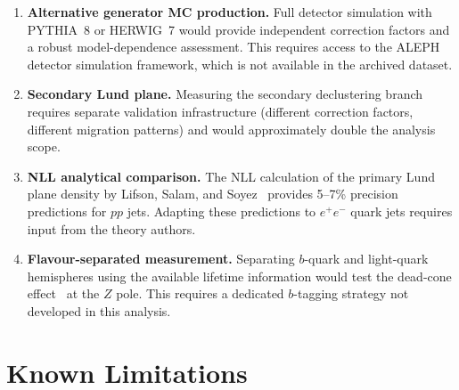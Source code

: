 \documentclass[11pt,a4paper]{article}
\begin{document}
\begin{enumerate}
\item \textbf{Alternative generator MC production.}  Full detector
  simulation with PYTHIA~8 or HERWIG~7 would provide independent
  correction factors and a robust model-dependence assessment.  This
  requires access to the ALEPH detector simulation framework, which
  is not available in the archived dataset.
\item \textbf{Secondary Lund plane.}  Measuring the secondary
  declustering branch requires separate validation infrastructure
  (different correction factors, different migration patterns) and
  would approximately double the analysis scope.
\item \textbf{NLL analytical comparison.}  The NLL calculation of
  the primary Lund plane density by Lifson, Salam, and
  Soyez~\cite{Lifson:2020gua} provides 5--7\% precision predictions
  for $pp$ jets.  Adapting these predictions to $e^+e^-$ quark jets
  requires input from the theory authors.
\item \textbf{Flavour-separated measurement.}  Separating $b$-quark
  and light-quark hemispheres using the available lifetime information
  would test the dead-cone effect~\cite{LHCb:2025viq} at the $Z$ pole.
  This requires a dedicated $b$-tagging strategy not developed in this
  analysis.
\end{enumerate}

\section{Known Limitations}
\label{sec:limitations}
\end{document}
